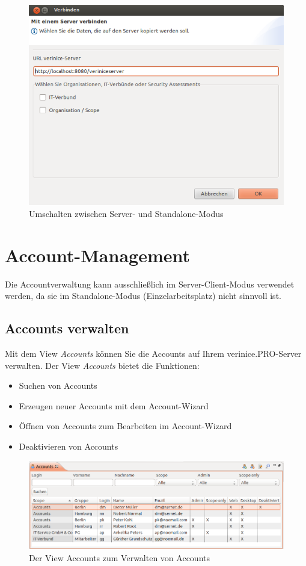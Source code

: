 \documentclass[a4paper,10pt]{book}
\begin{document}
\begin{figure}[htb!]
  \centering
  \includegraphics[scale=.6]{Screenshot/Modus_wechseln.png}
  \caption{\label{Umschalten zwischen Server- und Standalone-Modus} Umschalten zwischen Server- und Standalone-Modus}
\end{figure}

\section{Account-Management} \label{Account-Management}
Die Accountverwaltung kann ausschließlich im Server-Client-Modus verwendet werden, da sie im Standalone-Modus (Einzelarbeitsplatz) nicht sinnvoll ist.

\subsection{Accounts verwalten}
Mit dem View \textit{Accounts} können Sie die Accounts auf Ihrem verinice.\textsc{PRO}-Server verwalten. Der View \textit{Accounts} bietet die Funktionen:
\begin{itemize}
\item Suchen von Accounts
\item Erzeugen neuer Accounts mit dem Account-Wizard
\item Öffnen von Accounts zum Bearbeiten im Account-Wizard
\item Deaktivieren von Accounts
\end{itemize}

\begin{figure}[htb!]
  \centering
  \includegraphics[scale=.345]{Screenshot/Account-View.png}
  \caption{\label{Der View Accounts zum Verwalten von Accounts} Der View Accounts zum Verwalten von Accounts}
\end{figure}
\end{document}
